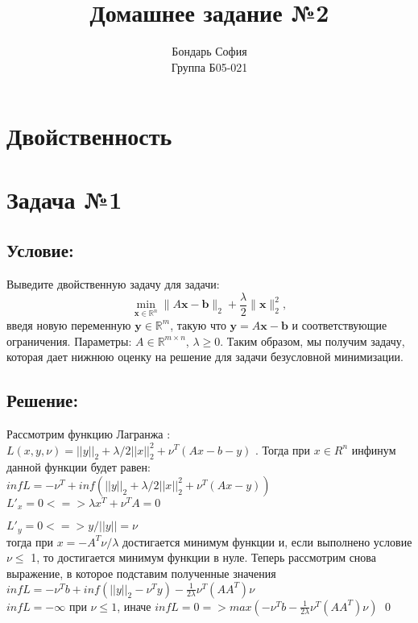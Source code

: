 \documentclass[a4paper,12pt]{article}
\author{Бондарь София\\
Группа Б05-021}
\title{Домашнее задание №2}
\date{\vspace{-10pt}}
\begin{document}
\maketitle


\section*{Двойственность}
\section*{Задача №1}
\subsection*{Условие:}
Выведите двойственную задачу для задачи:
    \begin{equation*}
        \min_{\mathbf{x}\in\mathbb{R}^n} \|A\mathbf{x}-\mathbf{b}\|_2+\frac{\lambda}{2}\|\mathbf{x}\|_2^2,
    \end{equation*}
    введя новую переменную $\mathbf{y}\in\mathbb{R}^m$, такую что $\mathbf{y}=A\mathbf{x}-\mathbf{b}$ и соответствующие ограничения. Параметры: $A\in\mathbb{R}^{m\times n}$, $\lambda \geq 0$. Таким образом, мы получим задачу, которая дает нижнюю оценку на решение для задачи безусловной минимизации.
\subsection*{Решение:}
Рассмотрим функцию Лагранжа : $L(x, y, \nu) = ||y||_2 + \lambda/2 ||x||_2^2 + \nu^T(Ax-b-y)$ . 
Тогда при $x \in R^n$ инфинум данной функции будет равен: \\ 

$ inf L = - \nu^T + inf (||y||_2 + \lambda/2 ||x||_2^2 + \nu^T(Ax-y)) $ \\

$ L'_x = 0 <=> \lambda x^T + \nu^TA = 0 $ 

$ L'_y = 0 <=> y/||y|| = \nu $ 
\\ 
тогда при $x = -A^T\nu / \lambda$ достигается минимум функции и, если выполнено условие $  \nu \leq $ 1, то достигается минимум функции в нуле. Теперь рассмотрим снова выражение, в которое подставим полученные значения \\ 

$ inf L = - \nu^Tb + inf (||y||_2 - \nu^Ty) - \frac{1}{2\lambda} \nu^T (AA^T)\nu $ \\

$ inf L = -\infty $ при $ \nu \leq 1 $, иначе $inf L = 0  => max (- \nu^Tb - \frac{1}{2\lambda} \nu^T (AA^T)\nu )$ \qed
\end{document}
